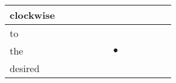 \documentclass[landscape]{article}
\newcommand{\ssp}{\hspace{2pt}}
\newcommand{\mex}{\cellcolor{g}$\bullet$}
\begin{document}
\begin{tabular}{|l|p{10pt}|p{10pt}|p{10pt}|p{10pt}|p{10pt}|p{10pt}|p{10pt}|p{10pt}|p{10pt}|p{10pt}|p{10pt}|}
\hline
\ssp clockwise \ssp&\hspace{2pt}&\hspace{2pt}&\hspace{2pt}&\hspace{2pt}&\hspace{2pt}&\hspace{2pt}&\hspace{2pt}&\hspace{2pt}&\hspace{2pt}&\hspace{2pt}&\hspace{2pt}\\
\hline
\ssp to \ssp&\hspace{2pt}&\hspace{2pt}&\hspace{2pt}&\hspace{2pt}&\hspace{2pt}&\hspace{2pt}&\hspace{2pt}&\hspace{2pt}&\hspace{2pt}&\hspace{2pt}&\hspace{2pt}\\
\hline
\ssp \cellcolor{ref5}the \ssp&\hspace{2pt}&\hspace{2pt}&\hspace{2pt}&\hspace{2pt}&\hspace{2pt}&\hspace{2pt}\mex&\hspace{2pt}&\hspace{2pt}&\hspace{2pt}&\hspace{2pt}&\hspace{2pt}\\
\hline
\ssp desired \ssp&\hspace{2pt}&\hspace{2pt}&\hspace{2pt}&\hspace{2pt}&\hspace{2pt}&\hspace{2pt}&\hspace{2pt}&\hspace{2pt}&\hspace{2pt}&\hspace{2pt}&\hspace{2pt}\\

\end{tabular}
\end{document}
